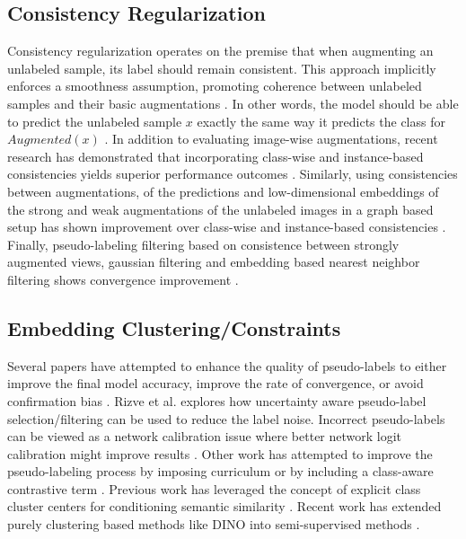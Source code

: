 \documentclass[10pt,twocolumn,letterpaper]{article}
\begin{document}
\subsection{Consistency Regularization}

Consistency regularization operates on the premise that when augmenting an unlabeled sample, its label should remain consistent. 
This approach implicitly enforces a smoothness assumption, promoting coherence between unlabeled samples and their basic augmentations \cite{xie2020unsupervised}. 
In other words, the model should be able to predict the unlabeled sample $x$ exactly the same way it predicts the class for $Augmented(x)$ \cite{berthelot2019mixmatch,sohn2020fixmatch,berthelot2019remixmatch,mustafa2020transformation}. 
In addition to evaluating image-wise augmentations, recent research has demonstrated that incorporating class-wise and instance-based consistencies yields superior performance outcomes \cite{zheng2022simmatch,li2021comatch}. 
Similarly, using consistencies between augmentations, of the predictions and low-dimensional embeddings of the strong and weak augmentations of the unlabeled images in a graph based setup has shown improvement over class-wise and instance-based consistencies \cite{zheng2023simmatchv2}.
Finally, pseudo-labeling filtering based on consistence between strongly augmented views, gaussian filtering and embedding based nearest neighbor filtering shows convergence improvement \cite{kim2022conmatch,menon2022semisupervised}.

\subsection{Embedding Clustering/Constraints}


Several papers have attempted to enhance the quality of pseudo-labels to either improve the final model accuracy, improve the rate of convergence, or avoid confirmation bias \cite{arazo2020pseudo}.
Rizve et al. \cite{rizve2021defense} explores how uncertainty aware pseudo-label selection/filtering can be used to reduce the label noise.
Incorrect pseudo-labels can be viewed as a network calibration issue \cite{rizve2021defense} where better network logit calibration might improve results \cite{Xing2020DistanceBased}.
Other work has attempted to improve the pseudo-labeling process by imposing curriculum \cite{zhang2021flexmatch} or by including a class-aware contrastive term \cite{yang2022class}.
Previous work has leveraged the concept of explicit class cluster centers for conditioning semantic similarity \cite{zheng2022simmatch}.
Recent work has extended purely clustering based methods like DINO \cite{caron2021emerging} into semi-supervised methods \cite{fini2023semi}.
\end{document}
